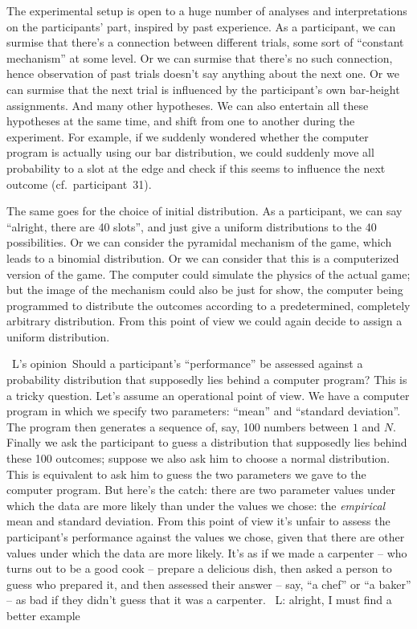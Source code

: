 \documentclass[\ifafour a4paper,12pt,\else a5paper,10pt,\fi%
onecolumn,oneside,article,%
british%
]{memoir}
\theoremstyle{remark}
\theoremstyle{innote}
\renewcommand*{\|}{\mathpunct{|}}
\newcommand*{\cf}{{cf.}}
\newcommand*{\puzzle}{\maltese}
\newcommand{\mynote}[1]{ {\color{notecolour}\puzzle\ #1\ }}
\begin{document}
The experimental setup is open to a huge number of analyses and
interpretations on the participants' part, inspired by past experience. As
a participant, we can surmise that there's a connection between different
trials, some sort of \enquote{constant mechanism} at some level. Or we can
surmise that there's no such connection, hence observation of past trials
doesn't say anything about the next one. Or we can surmise that the next
trial is influenced by the participant's own bar-height assignments. And
many other hypotheses. We can also entertain all these hypotheses at the
same time, and shift from one to another during the experiment. For
example, if we suddenly wondered whether the computer program is actually
using our bar distribution, we could suddenly move all probability to a
slot at the edge and check if this seems to influence the next outcome
(\cf\ participant~31).

\medskip
The same goes for the choice of initial distribution. As a participant, we
can say \enquote{alright, there are 40 slots}, and just give a uniform
distributions to the 40 possibilities. Or we can consider the pyramidal
mechanism of the game, which leads to a binomial distribution. Or we can
consider that this is a computerized version of the game. The computer
could simulate the physics of the actual game; but the image of the
mechanism could also be just for show, the computer being programmed to
distribute the outcomes according to a predetermined, completely arbitrary
distribution. From this point of view we could again decide to assign a
uniform distribution.

\medskip \mynote{L's opinion}Should a participant's \enquote{performance}
be assessed against a probability distribution that supposedly lies behind
a computer program? This is a tricky question. Let's assume an operational
point of view. We have a computer program in which we specify two
parameters: \enquote{mean} and \enquote{standard deviation}. The program
then generates a sequence of, say, 100 numbers between $1$ and $N$. Finally
we ask the participant to guess a distribution that supposedly lies behind
these 100 outcomes; suppose we also ask him to choose a normal
distribution. This is equivalent to ask him to guess the two parameters we
gave to the computer program. But here's the catch: there are two parameter
values under which the data are more likely than under the values we chose:
the \emph{empirical} mean and standard deviation. From this point of view
it's unfair to assess the participant's performance against the values we
chose, given that there are other values under which the data are more
likely. It's as if we made a carpenter -- who turns out to be a good cook
-- prepare a delicious dish, then asked a person to guess who prepared it,
and then assessed their answer -- say, \enquote{a chef} or \enquote{a
  baker} -- as bad if they didn't guess that it was a
carpenter.\mynote{L: alright, I must find a better example}
\end{document}
